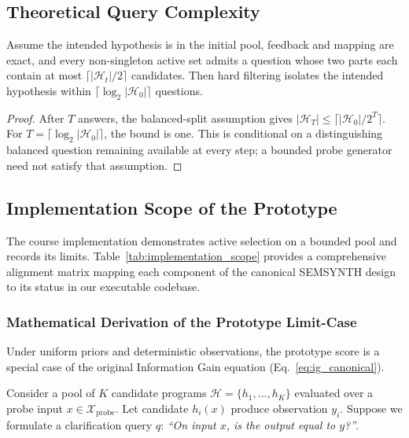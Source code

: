 \subsection{Theoretical Query Complexity}

\begin{theorem}\label{thm:query_bound}
Assume the intended hypothesis is in the initial pool, feedback and mapping are exact, and every non-singleton active set admits a question whose two parts each contain at most $\lceil |\mathcal H_t|/2\rceil$ candidates. Then hard filtering isolates the intended hypothesis within $\lceil\log_2|\mathcal H_0|\rceil$ questions.
\end{theorem}
\begin{proof}
After $T$ answers, the balanced-split assumption gives
$|\mathcal H_T|\leq\lceil|\mathcal H_0|/2^T\rceil$.
For $T=\lceil\log_2|\mathcal H_0|\rceil$, the bound is one. This is conditional on a distinguishing balanced question remaining available at every step; a bounded probe generator need not satisfy that assumption.
\end{proof}

\subsection{Implementation Scope of the Prototype}\label{sec:method:scope}

The course implementation demonstrates active selection on a bounded pool and records its limits. Table~\ref{tab:implementation_scope} provides a comprehensive alignment matrix mapping each component of the canonical SEMSYNTH design to its status in our executable codebase.



\subsubsection{Mathematical Derivation of the Prototype Limit-Case}
Under uniform priors and deterministic observations, the prototype score is a special case of the original Information Gain equation (Eq.~\ref{eq:ig_canonical}).

Consider a pool of $K$ candidate programs $\mathcal{H} = \{h_1, \dots, h_K\}$ evaluated over a probe input $x \in \mathcal{X}_{\text{probe}}$. Let candidate $h_i(x)$ produce observation $y_i$. Suppose we formulate a clarification query $q$: \textit{``On input $x$, is the output equal to $y$?''}.


